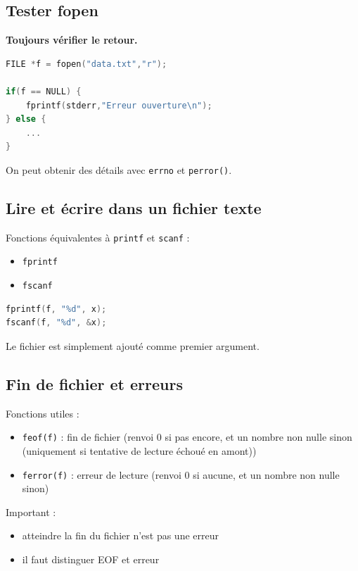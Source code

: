 \subsection{Tester fopen}

\textbf{Toujours vérifier le retour.}

\begin{lstlisting}[language=C]
FILE *f = fopen("data.txt","r");

if(f == NULL) {
    fprintf(stderr,"Erreur ouverture\n");
} else {
    ...
}
\end{lstlisting}

On peut obtenir des détails avec \texttt{errno} et \texttt{perror()}.

\subsection{Lire et écrire dans un fichier texte}

Fonctions équivalentes à \texttt{printf} et \texttt{scanf} :

\begin{itemize}
    \item \texttt{fprintf}
    \item \texttt{fscanf}
\end{itemize}

\begin{lstlisting}[language=C]
fprintf(f, "%d", x);
fscanf(f, "%d", &x);
\end{lstlisting}

Le fichier est simplement ajouté comme premier argument.

\subsection{Fin de fichier et erreurs}

Fonctions utiles :

\begin{itemize}
  \item \texttt{feof(f)} : fin de fichier (renvoi 0 si pas encore, et un nombre non nulle sinon (uniquement si tentative de lecture échoué en amont))
  \item \texttt{ferror(f)} : erreur de lecture (renvoi 0 si aucune, et un nombre non nulle sinon)
\end{itemize}

Important :

\begin{itemize}
    \item atteindre la fin du fichier n’est pas une erreur
    \item il faut distinguer EOF et erreur
\end{itemize}

